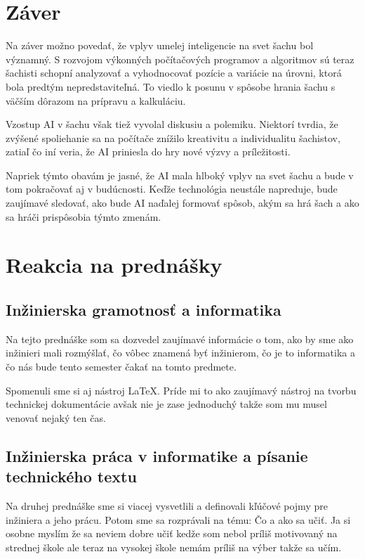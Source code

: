 \documentclass[10pt,oneside,slovak,a4paper]{article}
\begin{document}
\section{Záver}

Na záver možno povedať, že vplyv umelej inteligencie na svet šachu bol významný. S rozvojom výkonných počítačových programov a algoritmov sú teraz šachisti schopní analyzovať a vyhodnocovať pozície a variácie na úrovni, ktorá bola predtým nepredstaviteľná. To viedlo k posunu v spôsobe hrania šachu s väčším dôrazom na prípravu a kalkuláciu.

Vzostup AI v šachu však tiež vyvolal diskusiu a polemiku. Niektorí tvrdia, že zvýšené spoliehanie sa na počítače znížilo kreativitu a individualitu šachistov, zatiaľ čo iní veria, že AI priniesla do hry nové výzvy a príležitosti.

Napriek týmto obavám je jasné, že AI mala hlboký vplyv na svet šachu a bude v tom pokračovať aj v budúcnosti. Keďže technológia neustále napreduje, bude zaujímavé sledovať, ako bude AI naďalej formovať spôsob, akým sa hrá šach a ako sa hráči prispôsobia týmto zmenám.

\section{Reakcia na prednášky}
\subsection{Inžinierska gramotnosť a informatika}

Na tejto prednáške som sa dozvedel zaujímavé informácie o tom, ako by sme ako inžinieri mali rozmýšlať, čo vôbec znamená byť inžinierom, čo je to informatika a čo nás bude tento semester čakať na tomto predmete.

Spomenuli sme si aj nástroj LaTeX. Príde mi to ako zaujímavý nástroj na tvorbu technickej dokumentácie avšak nie je zase jednoduchý takže som mu musel venovať nejaký ten čas.


\subsection{Inžinierska práca v informatike a písanie technického textu}

Na druhej prednáške sme si viacej vysvetlili a definovali kľúčové pojmy pre inžiniera a jeho prácu. Potom sme sa rozprávali na tému: Čo a ako sa učiť. Ja si osobne myslím že sa neviem dobre učiť kedže som nebol príliš motivovaný na strednej škole ale teraz na vysokej škole nemám príliš na výber takže sa učím.
\end{document}
